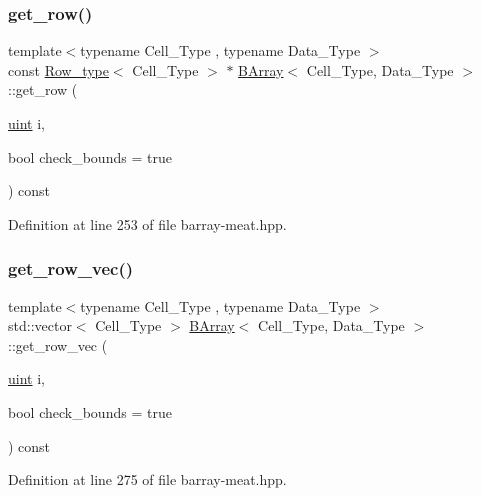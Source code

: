 \subsubsection{\texorpdfstring{get\+\_\+row()}{get\_row()}}
{\footnotesize\ttfamily template$<$typename Cell\+\_\+\+Type , typename Data\+\_\+\+Type $>$ \\
const \hyperlink{typedefs_8hpp_a4deca4f3fb25a4da374818ab459b8b4a}{Row\+\_\+type}$<$ Cell\+\_\+\+Type $>$ $\ast$ \hyperlink{class_b_array}{B\+Array}$<$ Cell\+\_\+\+Type, Data\+\_\+\+Type $>$\+::get\+\_\+row (\begin{DoxyParamCaption}\item[{\hyperlink{typedefs_8hpp_a91ad9478d81a7aaf2593e8d9c3d06a14}{uint}}]{i,  }\item[{bool}]{check\+\_\+bounds = {\ttfamily true} }\end{DoxyParamCaption}) const\hspace{0.3cm}{\ttfamily [inline]}}



Definition at line 253 of file barray-\/meat.\+hpp.

\mbox{\label{class_b_array_a2be45b966d99e2bdd3f9994ed70ff145}} 
\subsubsection{\texorpdfstring{get\+\_\+row\+\_\+vec()}{get\_row\_vec()}}
{\footnotesize\ttfamily template$<$typename Cell\+\_\+\+Type , typename Data\+\_\+\+Type $>$ \\
std\+::vector$<$ Cell\+\_\+\+Type $>$ \hyperlink{class_b_array}{B\+Array}$<$ Cell\+\_\+\+Type, Data\+\_\+\+Type $>$\+::get\+\_\+row\+\_\+vec (\begin{DoxyParamCaption}\item[{\hyperlink{typedefs_8hpp_a91ad9478d81a7aaf2593e8d9c3d06a14}{uint}}]{i,  }\item[{bool}]{check\+\_\+bounds = {\ttfamily true} }\end{DoxyParamCaption}) const\hspace{0.3cm}{\ttfamily [inline]}}



Definition at line 275 of file barray-\/meat.\+hpp.

\mbox{\label{class_b_array_a25f32967d46f1df46ee4b0eea593a66d}} 

